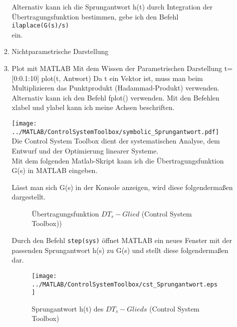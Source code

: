 \begin{enumerate}
\begin{enumerate}
                    Alternativ kann ich die Sprungantwort h(t) durch Integration der Übertragungsfunktion bestimmen, gebe ich den Befehl \\
                        \texttt{ilaplace(G(s)/s)}\\
                    ein.


            \item{Nichtparametrische Darstellung}
                
                    \item{Plot mit MATLAB}
                        Mit dem Wissen der Parametrischen Darstellung 
                        t=[0:0.1:10]
                        plot(t, Antwort)
                        Da t ein Vektor ist, muss man beim Multiplizieren das Punktprodukt (Hadammad-Produkt) verwenden.
                        Alternativ kann ich den Befehl fplot() verwenden.
                        Mit den Befehlen xlabel und ylabel kann ich meine Achsen beschriften.
                        
			\texttt{[image: ../MATLAB/ControlSystemToolbox/symbolic\_Sprungantwort.pdf]}\\


                                Die Control System Toolbox dient der systematischen Analyse, dem Entwurf und der Optimierung linearer Systeme.\\
                                Mit dem folgenden Matlab-Skript kann ich die Übertragungsfunktion G(s) in MATLAB eingeben.
                                    
                                Lässt man sich G(s) in der Konsole anzeigen, wird diese folgendermaßen dargestellt.
                                    \begin{figure}[H]
                                        \centering
                                        \caption{Übertragungsfunktion $DT_s-Glied$ (Control System Toolbox))}
                                    \end{figure}
                                Durch den Befehl \texttt{step(sys)} öffnet MATLAB ein neues Fenster mit der passenden Sprungantwort h(s) zu G(s) und stellt diese folgendermaßen dar.
                                    \begin{figure}[H]
                                        \centering
                                        \texttt{[image: ../MATLAB/ControlSystemToolbox/cst\_Sprungantwort.eps]}
                                        \caption{Sprungantwort h(t) des $DT_s-Glieds$ (Control System Toolbox)}
                                    \end{figure}
                    \begin{itemize}
                   

\end{itemize}
\end{enumerate}
\end{enumerate}
